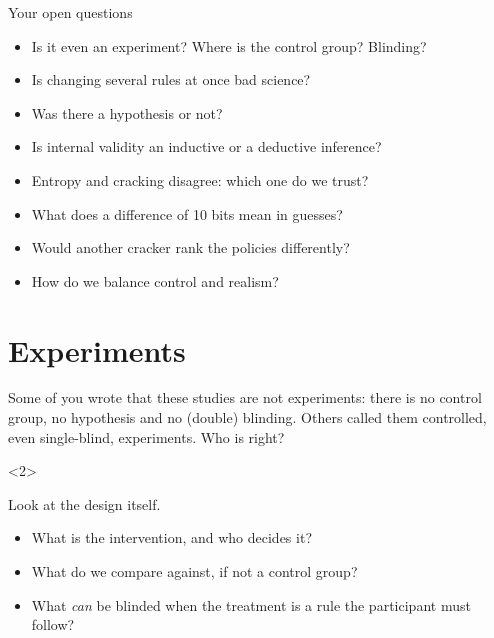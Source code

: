 \begin{frame}
  \begin{block}{Your open questions}
    \begin{itemize}
      \item Is it even an experiment? Where is the control group? Blinding?
      \item Is changing several rules at once bad science?
      \item Was there a hypothesis or not?
      \item Is internal validity an inductive or a deductive inference?
      \item Entropy and cracking disagree: which one do we trust?
      \item What does a difference of 10 bits mean in guesses?
      \item Would another cracker rank the policies differently?
      \item How do we balance control and realism?
    \end{itemize}
  \end{block}

\end{frame}

\section{Experiments}

\begin{frame}
  \begin{question}
    Some of you wrote that these studies are not experiments: there is no
    control group, no hypothesis and no (double) blinding.
    Others called them controlled, even single-blind, experiments.
    Who is right?
  \end{question}

  \begin{onlyenv}<2>
    \begin{question}
      Look at the design itself.
      \begin{itemize}
        \item What is the intervention, and who decides it?
        \item What do we compare against, if not a control group?
        \item What \emph{can} be blinded when the treatment is a rule the
          participant must follow?
      \end{itemize}
    \end{question}
  \end{onlyenv}
\end{frame}

